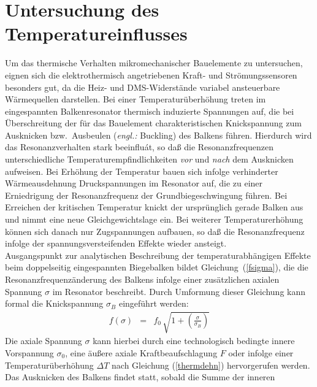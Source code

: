 \section{Untersuchung des Temperatureinflusses}
\label{temperaturverhalten}


Um das thermische Verhalten mikromechanischer Bauelemente zu untersuchen,
eignen sich die elektrothermisch angetriebenen Kraft- und Strömungssensoren
besonders gut, da die Heiz- und DMS-Widerstände variabel ansteuerbare
Wärmequellen darstellen. Bei einer Temperaturüberhöhung treten im
eingespannten Balkenresonator thermisch induzierte Spannungen
auf, die bei Überschreitung der für das Bauelement charakteristischen
Knickspannung zum Ausknicken bzw.\ Ausbeulen ({\em engl.:} Buckling)
des Balkens führen. Hierdurch wird das Resonanzverhalten stark
beeinfluát, so daß die Resonanzfrequenzen unterschiedliche
Temperaturempfindlichkeiten {\em vor} und {\em nach} dem Ausknicken
aufweisen. Bei Erhöhung der Temperatur bauen sich infolge verhinderter
Wärmeausdehnung Druckspannungen im Resonator auf, die zu einer
Erniedrigung der Resonanzfrequenz der Grundbiegeschwingung führen.
Bei Erreichen der kritischen Temperatur knickt der ursprünglich gerade
Balken aus und nimmt eine neue Gleichgewichtslage ein.
Bei weiterer Temperaturerhöhung können sich danach nur Zugspannungen
aufbauen, so daß die Resonanzfrequenz infolge der spannungsversteifenden
Effekte wieder ansteigt.\\
%
Ausgangspunkt zur analytischen Beschreibung der temperaturabhängigen
Effekte beim doppelseitig eingespannten Biegebalken bildet
Gleichung~(\ref{fsigma}), die die Resonanzfrequenzänderung des Balkens
infolge einer zusätzlichen axialen Spannung $\sigma$ im Resonator
beschreibt. Durch Umformung dieser Gleichung kann
formal die Knickspannung $\sigma_{B}$ eingeführt werden:
\begin{eqnarray}
\label{fbuckling}
 f(\sigma) & = & f_{0} \, \sqrt{1 + \left( \frac{\sigma}{\sigma_{B}} \right)}
\end{eqnarray}
Die axiale Spannung $\sigma$ kann hierbei durch eine technologisch bedingte
innere Vorspannung $\sigma_{0}$, eine äußere axiale Kraftbeaufschlagung
$F$ oder infolge einer Temperaturüberhöhung $\Delta T$ nach Gleichung
(\ref{thermdehn}) hervorgerufen werden.
Das Ausknicken des Balkens findet statt, sobald die Summe der inneren
